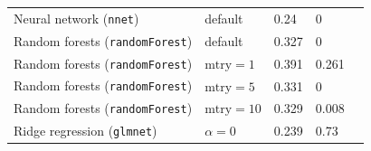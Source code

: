 \documentclass[12pt]{article}
\begin{document}
\begin{singlespace}
\begin{appendices}
\begin{table}[htb]
\begin{tabularx}{\linewidth}{l*{4}{Y}}
Neural network (\texttt{nnet}) &  default & 0.24 & 0 \\ 
Random forests (\texttt{randomForest}) & default & 0.327 & 0 \\ 
Random forests (\texttt{randomForest})  & $\mathrm{mtry}=1$ & 0.391 & 0.261 \\ 
Random forests (\texttt{randomForest})  & $\mathrm{mtry}=5$  & 0.331 & 0 \\ 
Random forests (\texttt{randomForest})  & $\mathrm{mtry}=10$ & 0.329 & 0.008 \\ 
Ridge regression (\texttt{glmnet}) &  $\alpha=0$ & 0.239 & 0.73 \\ 
   \hline
    \bottomrule
  \end{tabularx}
\end{table}
\end{appendices}
\end{singlespace}

\itemize
\end{document}
